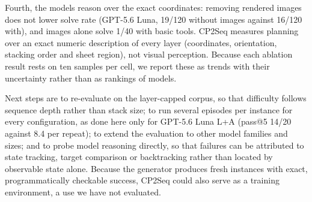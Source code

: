 Fourth, the models reason over the exact coordinates: removing rendered images does not lower
solve rate (GPT-5.6 Luna, 19/120 without images against 16/120 with), and images alone solve 1/40
with basic tools. CP2Seq measures planning over an exact numeric
description of every layer (coordinates, orientation, stacking order and sheet region), not visual
perception. Because each ablation result rests on ten samples per cell, we report these
as trends with their uncertainty rather than as rankings of models.

Next steps are to re-evaluate on the layer-capped corpus, so that difficulty follows sequence
depth rather than stack size; to run several episodes per instance for every configuration, as done
here only for GPT-5.6 Luna L+A (pass@5 14/20 against 8.4 per repeat); to extend the evaluation to
other model families and sizes; and to probe model reasoning directly, so that failures can be
attributed to state tracking, target comparison or backtracking rather than located by observable
state alone. Because the generator produces fresh instances with exact, programmatically checkable
success, CP2Seq could also serve as a training environment, a use we have not evaluated.
\label{sec:main-text-end}
